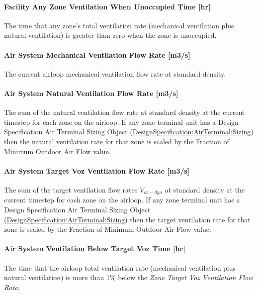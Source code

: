 \paragraph{Facility Any Zone Ventilation When Unoccupied Time {[}hr{]}}\label{facility-any-zone-ventilation-when-unoccupied-time}
The time that any zone's total ventilation rate (mechanical ventilation plus natural ventilation) is greater than zero when the zone is unoccupied.

\paragraph{Air System Mechanical Ventilation Flow Rate {[}m3/s{]}}\label{air-system-mechanical-ventilation-flow-rate}
The current airloop mechanical ventilation flow rate at standard density.

\paragraph{Air System Natural Ventilation Flow Rate {[}m3/s{]}}\label{air-system-natural-ventilation-flow-rate}
The sum of the natural ventilation flow rate at standard density at the current timestep for each zone on the airloop. If any zone terminal unit has a Design Specification Air Terminal Sizing Object  (\hyperref[designspecificationairterminalsizing]{DesignSpecification:AirTerminal:Sizing}) then the natural ventilation rate for that zone is scaled by the Fraction of Minimum Outdoor Air Flow value.

\paragraph{Air System Target Voz Ventilation Flow Rate {[}m3/s{]}}\label{air-system-target-voz-ventilation-flow-rate}
The sum of the target ventilation flow rates \(V_{oz-dyn}\) at standard density at the current timestep for each zone on the airloop. If any zone terminal unit has a Design Specification Air Terminal Sizing Object  (\hyperref[designspecificationairterminalsizing]{DesignSpecification:AirTerminal:Sizing}) then the target ventilation rate for that zone is scaled by the Fraction of Minimum Outdoor Air Flow value.

\paragraph{Air System Ventilation Below Target Voz Time {[}hr{]}}\label{air-system-ventilation-below-target-voz-time}
The time that the airloop total ventilation rate (mechanical ventilation plus natural ventilation) is more than 1\% below the \emph{Zone Target Voz Ventilation Flow Rate}.

